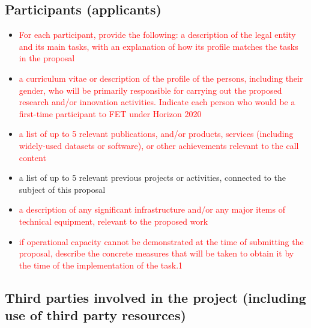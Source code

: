 \documentclass[12pt, a4paper]{article} %
\begin{document}
 \subsection{Participants (applicants)}

 \begin{itemize}
 \item \textcolor{red}{For each participant, provide the following: a
     description of the legal entity and its main tasks, with an
     explanation of how its profile matches the tasks in the proposal}
 \item \textcolor{red}{a curriculum vitae or description of the
     profile of the persons, including their gender, who will be
     primarily responsible for carrying out the proposed research
     and/or innovation activities. Indicate each person who would be a
     first-time participant to FET under Horizon 2020}
\item \textcolor{red}{a list of up to 5 relevant publications, and/or
    products, services (including widely-used datasets or software),
    or other achievements relevant to the call content}
 \item a list of up to 5 relevant previous projects or activities,
   connected to the subject of this proposal
 \item \textcolor{red}{a description of any significant infrastructure
     and/or any major items of technical equipment, relevant to the
     proposed work}
 \item \textcolor{red}{if operational capacity cannot be demonstrated
     at the time of submitting the proposal, describe the concrete
     measures that will be taken to obtain it by the time of the
     implementation of the task.1}
 \end{itemize}

 \subsection{Third parties involved in the project (including use of third party resources)}
\end{document}
